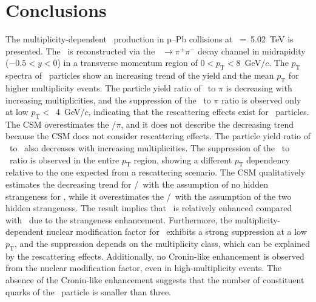
\section{Conclusions}
\label{sec:summary}

The multiplicity-dependent \fzero~production in p--Pb collisions at \snn~=~5.02~TeV is presented. The \fzero~is reconstructed via the \fzero~$\rightarrow\pi^{+}\pi^{-}$ decay channel in midrapidity ($-0.5<y<0$) in a transverse momentum region of $0<p_{\mathrm{T}}<8$~GeV/$c$. The $p_{\mathrm{T}}$ spectra of \fzero~particles show an increasing trend of the yield and the mean $p_{\mathrm{T}}$ for higher multiplicity events. The particle yield ratio of \fzero~to $\pi$ is decreasing with increasing multiplicities, and the suppression of the \fzero~to $\pi$ ratio is observed only at low $p_{\mathrm{T}}<$~4~GeV/$c$, indicating that the rescattering effects exist for \fzero~particles. The CSM overestimates the \fzero/$\pi$, and it does not describe the decreasing trend because the CSM does not consider rescattering effects. The particle yield ratio of \fzero~to \kstar~also decreases with increasing multiplicities. The suppression of the \fzero~to \kstar~ratio is observed in the entire $p_{\mathrm{T}}$ region, showing a different $p_{\mathrm{T}}$ dependency relative to the one expected from a rescattering scenario. The CSM qualitatively estimates the decreasing trend for \fzero/\kstar~with the assumption of no hidden strangeness for \fzero, while it overestimates the \fzero/\kstar~with the assumption of the two hidden strangeness. The result implies that \kstar~is relatively enhanced compared with \fzero~due to the strangeness enhancement. Furthermore, the multiplicity-dependent nuclear modification factor for \fzero~exhibits a strong suppression at a low $p_{\mathrm{T}}$, and the suppression depends on the multiplicity class, which can be explained by the rescattering effects. Additionally, no Cronin-like enhancement is observed from the nuclear modification factor, even in high-multiplicity events. The absence of the Cronin-like enhancement suggests that the number of constituent quarks of the \fzero~particle is smaller than three.